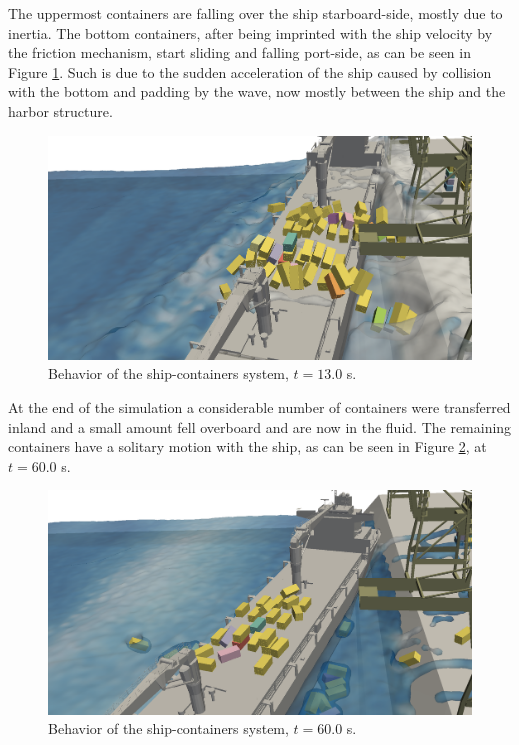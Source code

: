 The uppermost containers are falling over the ship starboard-side, mostly due to inertia. The bottom containers, after being imprinted with the ship velocity by the friction mechanism, start sliding and falling port-side, as can be seen in Figure \ref{fig:ship_t65}. Such is due to the sudden acceleration of the ship caused by collision with the bottom and padding by the wave, now mostly between the ship and the harbor structure.
%
\begin{figure}[H]
	\centering
	\includegraphics[width=0.95\linewidth]{Figures/6.Chapter/ship_t65} 
	\caption{Behavior of the ship-containers system, $t=13.0$ s.}
	\label{fig:ship_t65} 
\end{figure}
%

At the end of the simulation a considerable number of containers were transferred inland and a small amount fell overboard and are now in the fluid. The remaining containers have a solitary motion with the ship, as can be seen in Figure \ref{fig:ship_t300}, at $t=60.0$ s.
%
\begin{figure}[H]
	\centering
	\includegraphics[width=0.95\linewidth]{Figures/6.Chapter/ship_t300} 
	\caption{Behavior of the ship-containers system, $t=60.0$ s.}
	\label{fig:ship_t300} 
\end{figure}
%


